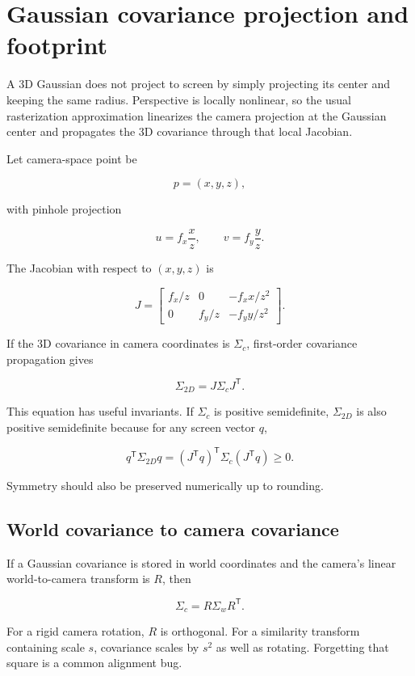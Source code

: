 \hypertarget{appendix-24269cb6977c}{}\label{referencestart:appendix-24269cb6977c}
\section{Gaussian covariance projection and footprint}\label{appendix-24269cb6977c-gaussian-covariance-projection-and-footprint}

A 3D Gaussian does not project to screen by simply projecting its center and keeping the same radius. Perspective is locally nonlinear, so the usual rasterization approximation linearizes the camera projection at the Gaussian center and propagates the 3D covariance through that local Jacobian.

Let camera-space point be

\[
p=(x,y,z),
\]

with pinhole projection

\[
u=f_x\frac{x}{z},
\qquad
v=f_y\frac{y}{z}.
\]

The Jacobian with respect to \((x,y,z)\) is

\[
J=
\begin{bmatrix}
f_x/z & 0 & -f_xx/z^2\\
0 & f_y/z & -f_yy/z^2
\end{bmatrix}.
\]

If the 3D covariance in camera coordinates is \(\Sigma_c\), first-order covariance propagation gives

\[
\Sigma_{2D}=J\Sigma_cJ^{\mathsf T}.
\]

This equation has useful invariants. If \(\Sigma_c\) is positive semidefinite, \(\Sigma_{2D}\) is also positive semidefinite because for any screen vector \(q\),

\[
q^{\mathsf T}\Sigma_{2D}q
=
(J^{\mathsf T}q)^{\mathsf T}\Sigma_c(J^{\mathsf T}q)
\ge0.
\]

Symmetry should also be preserved numerically up to rounding.

\subsection{World covariance to camera covariance}\label{appendix-24269cb6977c-world-covariance-to-camera-covariance}

If a Gaussian covariance is stored in world coordinates and the camera's linear world-to-camera transform is \(R\), then

\[
\Sigma_c=R\Sigma_wR^{\mathsf T}.
\]

For a rigid camera rotation, \(R\) is orthogonal. For a similarity transform containing scale \(s\), covariance scales by \(s^2\) as well as rotating. Forgetting that square is a common alignment bug.

